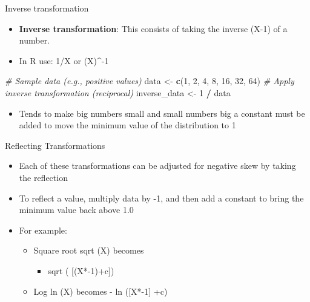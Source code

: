 \documentclass[
  ignorenonframetext,
]{beamer}
\newenvironment{Shaded}{\begin{snugshade}}{\end{snugshade}}
\newcommand{\CommentTok}[1]{\textcolor[rgb]{0.56,0.35,0.01}{\textit{#1}}}
\newcommand{\DecValTok}[1]{\textcolor[rgb]{0.00,0.00,0.81}{#1}}
\newcommand{\FunctionTok}[1]{\textcolor[rgb]{0.13,0.29,0.53}{\textbf{#1}}}
\newcommand{\NormalTok}[1]{#1}
\newcommand{\OtherTok}[1]{\textcolor[rgb]{0.56,0.35,0.01}{#1}}
\newcommand{\SpecialCharTok}[1]{\textcolor[rgb]{0.81,0.36,0.00}{\textbf{#1}}}
\providecommand{\tightlist}{%
  \setlength{\itemsep}{0pt}\setlength{\parskip}{0pt}}
\begin{document}
\begin{frame}[fragile]{Inverse transformation}
\label{inverse-transformation}
\begin{itemize}
\tightlist
\item
  \textbf{Inverse transformation}: This consists of taking the inverse
  (X-1) of a number.
\item
  In R use: 1/X or (X)\^{}-1
\end{itemize}

\begin{Shaded}
\begin{Highlighting}[]
\CommentTok{\# Sample data (e.g., positive values)}
\NormalTok{data }\OtherTok{\textless{}{-}} \FunctionTok{c}\NormalTok{(}\DecValTok{1}\NormalTok{, }\DecValTok{2}\NormalTok{, }\DecValTok{4}\NormalTok{, }\DecValTok{8}\NormalTok{, }\DecValTok{16}\NormalTok{, }\DecValTok{32}\NormalTok{, }\DecValTok{64}\NormalTok{)}
\CommentTok{\# Apply inverse transformation (reciprocal)}
\NormalTok{inverse\_data }\OtherTok{\textless{}{-}} \DecValTok{1} \SpecialCharTok{/}\NormalTok{ data}
\end{Highlighting}
\end{Shaded}

\begin{itemize}
\tightlist
\item
  Tends to make big numbers small and small numbers big a constant must
  be added to move the minimum value of the distribution to 1
\end{itemize}
\end{frame}

\begin{frame}{Reflecting Transformations}
\label{reflecting-transformations}
\begin{itemize}
\tightlist
\item
  Each of these transformations can be adjusted for negative skew by
  taking the reflection
\item
  To reflect a value, multiply data by -1, and then add a constant to
  bring the minimum value back above 1.0\\
\item
  For example:

  \begin{itemize}
  \tightlist
  \item
    Square root sqrt (X) becomes

    \begin{itemize}
    \tightlist
    \item
      sqrt ( {[}(X*-1)+c{]})
    \end{itemize}
  \item
    Log ln (X) becomes - ln ({[}X*-1{]} +c)
  \end{itemize}
\end{itemize}
\end{frame}
\end{document}
